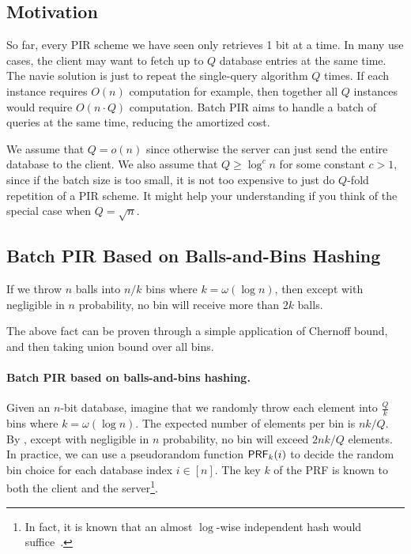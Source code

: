  \subsection{Motivation}
    So far, every PIR scheme we have seen only retrieves 1 bit at a time. 
    In many use cases, the client may want to fetch up to $Q$ database entries at the same time. 
    The navie solution is just to repeat the single-query algorithm $Q$ times.
If each instance
requires $O(n)$ computation for example,
then together all $Q$ instances 
would require $O(n \cdot Q)$ computation.
Batch PIR aims to handle a batch of queries at the same time, 
reducing the amortized cost.

We assume that $Q = o(n)$ since otherwise 
the server can just send the entire database to the client. 
We also assume that $Q \geq \log^c n$ for some constant $c > 1$, since if
the batch size is too small, 
it is not too expensive to just do $Q$-fold repetition of a PIR scheme. 
It might help your understanding if you think of the special 
case when $Q = \sqrt{n}$.
     
\subsection{Batch PIR Based on Balls-and-Bins Hashing}

\begin{fact}
If we throw 
$n$ balls into $n/k$ bins where $k = \omega(\log n)$,  
then except with negligible in $n$ probability, 
no bin will receive more than $2k$ balls.
\label{fct:ballsbins}
\end{fact}
The above fact can be proven through a simple application
of Chernoff bound, and then taking union bound over all bins.

\paragraph{Batch PIR based on balls-and-bins hashing.}
Given an $n$-bit database, imagine that we randomly throw each element
into $\frac{Q}{k}$ bins where %
$k = \omega(\log n)$.
The expected number of elements per bin is 
$n k /Q$. 
By ,
except with negligible in $n$ probability,
no bin will exceed $2 n k /Q$ elements.
In practice, we can use a pseudorandom function ${\sf PRF}_k(i)$
to decide the random bin 
choice for each database index $i \in [n]$. 
The key $k$ of the PRF is 
known to both the client and the server\footnote{In fact,
it is known that an almost 
$\log$-wise independent hash would suffice~\cite{logwise}.}.



